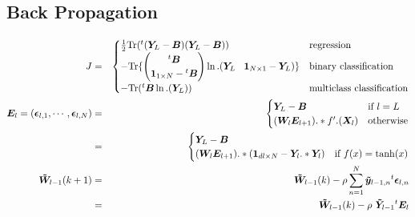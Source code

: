 \documentclass{article}
\begin{document}
\subsection{Back Propagation}
\begin{eqnarray}
J &=&   
\begin{cases}
  \frac{1}{2} \mathrm{Tr} ({}^t(\bm{Y}_L - \bm{B})(\bm{Y}_L - \bm{B}))
  &\mbox{regression} \\
  -\mathrm{Tr} \{
  \begin{pmatrix}
    {}^t\bm{B} \\
    \bm{1}_{1 \times N} - {}^t\bm{B}
  \end{pmatrix}
  \ln. ( \bm{Y}_L \hspace{3mm}  \bm{1}_{N \times 1} - \bm{Y}_L) \} &\mbox{binary classification}\\ 
  -\mathrm{Tr} ({}^t\bm{B} \ln.(\bm{Y}_L)) &\mbox{multiclass classification}
  \end{cases}\\
  \bm{E}_l = (\bm{\epsilon}_{l,1}, \cdots, \bm{\epsilon}_{l,N}) &=&
  \begin{cases}
    \bm{Y}_L - \bm{B}  &\mbox{if } l=L \\
    (\bm{W}_l\bm{E}_{l+1}) .* f'.(\bm{X}_l) &\mbox{otherwise}
  \end{cases} \\
  &=&
  \begin{cases}
    \bm{Y}_L - \bm{B} \\
    (\bm{W}_l\bm{E}_{l+1}).*(\bm{1}_{dl\times N}-\bm{Y}_l.*\bm{Y}_l) &\mbox{if } f(x)=\tanh(x)
  \end{cases} \\
  \bm{\tilde{W}}_{l-1}(k+1) &=& \bm{\tilde{W}}_{l-1}(k) - \rho
  \sum_{n=1}^N \bm{\tilde{y}}_{l-1,n} {}^t\bm{\epsilon}_{l,n}\\
  &=& \bm{\tilde{W}}_{l-1}(k) - \rho\ \bm{\tilde{Y}}_{l-1} {}^t\bm{E}_l
\end{eqnarray}
\end{document}
